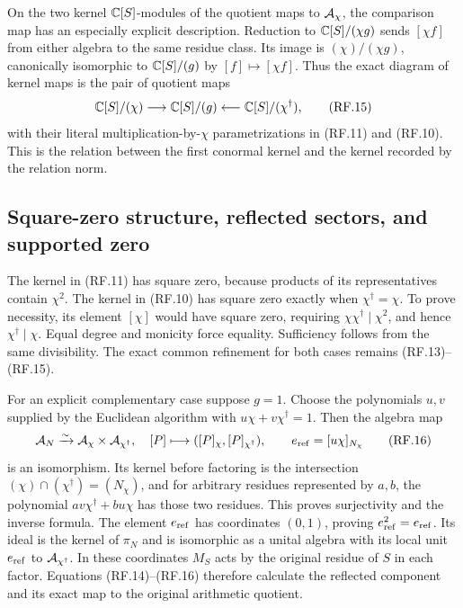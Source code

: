 On the two kernel $\mathbb C[S]$-modules of the quotient maps to $\mathcal A_\chi$,
the comparison map has
an especially explicit description. Reduction to $\mathbb C[S]/(\chi g)$
sends $[\chi f]$ from either algebra to the same residue class.
Its image is $(\chi)/(\chi g)$, canonically isomorphic to
$\mathbb C[S]/(g)$ by $[f]\mapsto[\chi f]$. Thus the exact diagram of
kernel maps is the pair of quotient maps
\[
 \mathbb C[S]/(\chi)\longrightarrow\mathbb C[S]/(g)
 \longleftarrow\mathbb C[S]/(\chi^\dagger),
 \tag{RF.15}
\]
with their literal multiplication-by-$\chi$ parametrizations in
(RF.11) and (RF.10). This is the relation between the first
conormal kernel and the kernel recorded by the relation norm.

\subsection{Square-zero structure, reflected sectors, and supported zero}

The kernel in (RF.11) has square zero, because products of its
representatives contain $\chi^2$. The kernel in (RF.10) has square
zero exactly when $\chi^\dagger=\chi$. To prove necessity, its
element $[\chi]$ would have square zero, requiring
$\chi\chi^\dagger\mid\chi^2$, and hence
$\chi^\dagger\mid\chi$. Equal degree and monicity force equality.
Sufficiency follows from the same divisibility. The exact common
refinement for both cases remains (RF.13)--(RF.15).

For an explicit complementary case suppose $g=1$. Choose the
polynomials $u,v$ supplied by the Euclidean algorithm with
$u\chi+v\chi^\dagger=1$. Then the algebra map
\[
 \mathcal A_N\xrightarrow{\sim}\mathcal A_\chi\times\mathcal A_{\chi^\dagger},
 \quad[P]\longmapsto([P]_{\chi},[P]_{\chi^\dagger}),
 \qquad e_{\rm ref}=[u\chi]_{N_\chi}
 \tag{RF.16}
\]
is an isomorphism. Its kernel before factoring is the intersection
$(\chi)\cap(\chi^\dagger)=(N_\chi)$, and for arbitrary residues
represented by $a,b$, the polynomial
$a v\chi^\dagger+b u\chi$ has those two residues. This proves
surjectivity and the inverse formula. The element $e_{\rm ref}$
has coordinates $(0,1)$, proving $e_{\rm ref}^2=e_{\rm ref}$.
Its ideal is the kernel of $\pi_N$ and is isomorphic as a unital
algebra with its local unit $e_{\rm ref}$ to
$\mathcal A_{\chi^\dagger}$. In these coordinates $M_S$ acts by the
original residue of $S$ in each factor. Equations (RF.14)--(RF.16)
therefore calculate the reflected component and its exact map to
the original arithmetic quotient.

